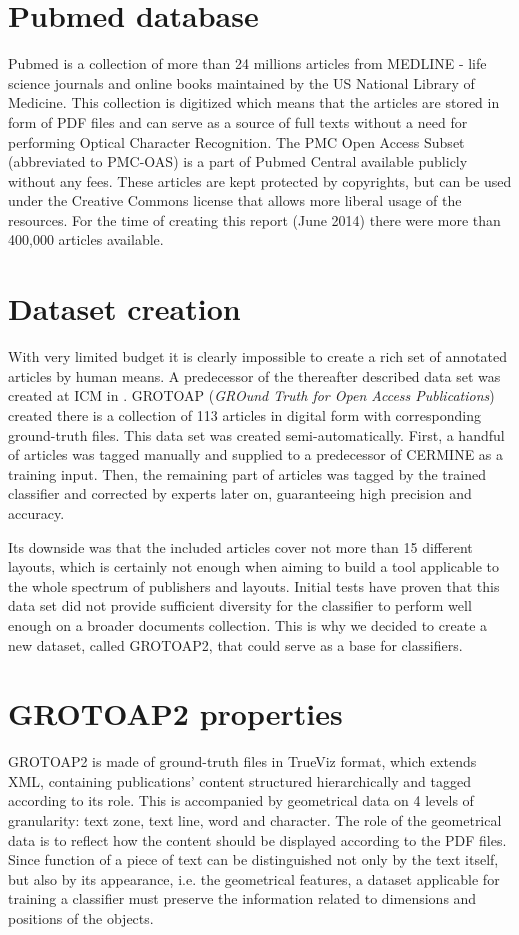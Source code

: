 \section{Pubmed database}
Pubmed \cite{Pubmed} is a collection of more than 24 millions articles from MEDLINE - life science journals and online books maintained by the US National Library of Medicine. This collection is digitized which means that the articles are stored in form of PDF files and can serve as a source of full texts without a need for performing Optical Character Recognition. 
The PMC Open Access Subset (abbreviated to PMC-OAS) is a part of Pubmed Central available publicly without any fees. These articles are kept protected by copyrights, but can be used under the Creative Commons license that allows more liberal usage of the resources. For the time of creating this report (June 2014) there were more than 400,000 articles available.
\section{Dataset creation}
With very limited budget it is clearly impossible to create a rich set of annotated articles by human means. A predecessor of the thereafter described data set was created at ICM in \cite{Tkaczyk2012}. GROTOAP (\textit{GROund Truth for Open Access Publications}) created there is a collection of 113 articles in digital form with corresponding ground-truth files. This data set was created semi-automatically. First, a handful of articles was tagged manually and supplied to a predecessor of CERMINE as a training input. Then, the remaining part of articles was tagged by the trained classifier and corrected by experts later on, guaranteeing high precision and accuracy.

Its downside was that the included articles cover not more than 15 different layouts, which is certainly not enough when aiming to build a tool applicable to the whole spectrum of publishers and layouts. Initial tests have proven that this data set did not provide sufficient diversity for the classifier to perform well enough on a broader documents collection. This is why we decided to create a new dataset, called GROTOAP2, that could serve as a base for classifiers.

\section{GROTOAP2 properties}
GROTOAP2 is made of ground-truth files in TrueViz format, which extends XML, containing publications' content structured hierarchically and tagged according to its role. This is accompanied by geometrical data on 4 levels of granularity: text zone, text line, word and character. The role of the geometrical data is to reflect how the content should be displayed according to the PDF files. Since function of a piece of text can be distinguished not only by the text itself, but also by its appearance, i.e. the geometrical features, a dataset applicable for training a classifier must preserve the information related to dimensions and positions of the objects.

